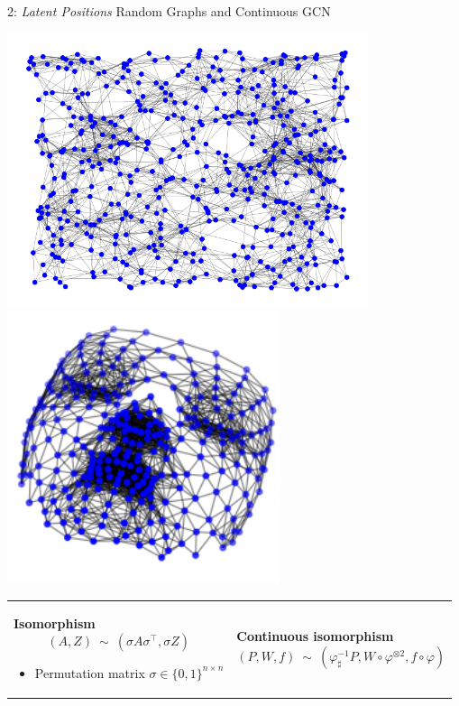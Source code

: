 \documentclass[final,dvipsnames]{beamer}
\newcommand{\vsp}{\vspace{10pt}}
\begin{document}
\begin{frame}{}
\begin{columns}[t]
\begin{column}{0.45\linewidth}
\begin{block}{2: \emph{Latent Positions} Random Graphs and Continuous GCN}
\begin{table}
{\begin{center}
\includegraphics[height=8cm]{img/ex_Gauss.png}\quad
\includegraphics[height=8cm]{img/ex_eps.png}
\end{center}

}

\begin{tabular}{p{\lsi\textwidth}|p{\rsi\textwidth}}
\hdashline
\textbf{Isomorphism}
\begin{equation*}
(A, Z) ~\sim~ (\sigma A \sigma^\top, \sigma Z)
\end{equation*}

\parbox{\lsi\textwidth}{\normalsize
\vsp
\begin{itemize}
\item Permutation matrix $\sigma \in \{0,1\}^{n\times n}$
\end{itemize}
\vsp
}
&
\textbf{Continuous isomorphism}
\begin{equation*}
(P,W,f) ~\sim~ (\varphi^{-1}_\sharp P, W \circ \varphi^{\otimes 2}, f \circ \varphi)
\end{equation*}


\end{tabular}
\end{table}
\end{block}
\end{column}
\end{columns}
\end{frame}
\end{document}
